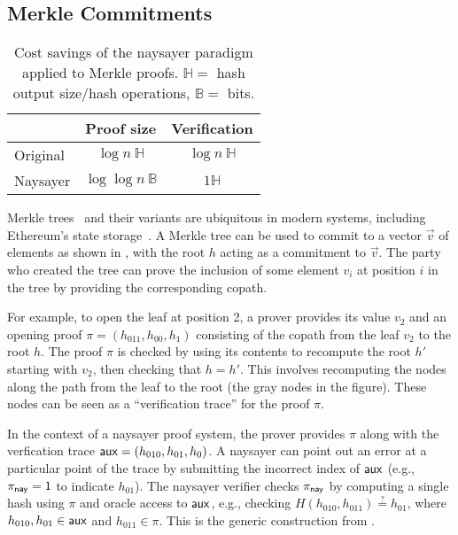 \subsection{Merkle Commitments}\label{sec:merkle_naysayer}

\begin{table}[h!]
   \centering
    \setlength{\belowbottomsep}{6pt}
    \begin{tabular}{l c c} 
    \toprule
     & \textbf{Proof size}
     & \textbf{Verification}
     \\ \midrule
     Original
     & $\log{n}\ \mathbb{H}$
     & $\log{n}\ \mathbb{H}$
     \\\midrule
     Naysayer
     & $\log\log{n}\ \mathbb{B}$
     & $1\mathbb{H}$
    \\ \bottomrule
    \end{tabular}
    \caption{Cost savings of the naysayer paradigm applied to Merkle proofs. $\mathbb{H} =$ hash output size/hash operations, $\mathbb{B} =$ bits.}
    \label{tab:merkle_asym}
\end{table}

Merkle trees~\cite{C:Merkle87} and their variants are ubiquitous in modern systems, including Ethereum's state storage~\cite{ethereum_trie}. A Merkle tree can be used to commit to a vector $\vec{v}$ of elements as shown in , with the root $h$ acting as a commitment to $\vec{v}$. The party who created the tree can prove the inclusion of some element $v_i$ at position $i$ in the tree by providing the corresponding copath. 

For example, to open the leaf at position 2, a prover provides its value $v_2$ and an opening proof $\pi = (h_{011}, h_{00}, h_{1})$ consisting of the copath from the leaf $v_2$ to the root $h$. The proof $\pi$ is checked by using its contents to recompute the root $h'$ starting with $v_2$, then checking that $h = h'$. This involves recomputing the nodes along the path from the leaf to the root (the gray nodes in the figure). These nodes can be seen as a ``verification trace'' for the proof $\pi$.


    
In the context of a naysayer proof system, the prover provides $\pi$ along with the verfication trace $\mathsf{aux} = (h_{010}, h_{01}, h_{0})$. A naysayer can point out an error at a particular point of the trace by submitting the incorrect index of $\mathsf{aux}$ (e.g., $\pi_{\mathsf{nay}} = 1$ to indicate $h_{01}$). The naysayer verifier checks $\pi_{\mathsf{nay}}$ by computing a single hash using $\pi$ and oracle access to $\mathsf{aux}$, e.g., checking $H(h_{010}, h_{011}) \stackrel{?}{=} h_{01}$, where $h_{010}, h_{01} \in \mathsf{aux}$ and $h_{011} \in \pi$. This is the generic construction from .

